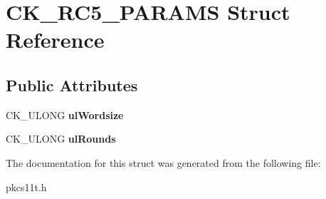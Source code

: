 \hypertarget{struct_c_k___r_c5___p_a_r_a_m_s}{}\section{C\+K\+\_\+\+R\+C5\+\_\+\+P\+A\+R\+A\+MS Struct Reference}
\label{struct_c_k___r_c5___p_a_r_a_m_s}
\subsection*{Public Attributes}
\begin{DoxyCompactItemize}
\item 
\mbox{\label{struct_c_k___r_c5___p_a_r_a_m_s_a3cd08884d3889efe696eeccbc2516aa5}} 
C\+K\+\_\+\+U\+L\+O\+NG {\bfseries ul\+Wordsize}
\item 
\mbox{\label{struct_c_k___r_c5___p_a_r_a_m_s_a2b562353a63ec7727f7348957702de03}} 
C\+K\+\_\+\+U\+L\+O\+NG {\bfseries ul\+Rounds}
\end{DoxyCompactItemize}


The documentation for this struct was generated from the following file\+:\begin{DoxyCompactItemize}
\item 
pkcs11t.\+h\end{DoxyCompactItemize}
